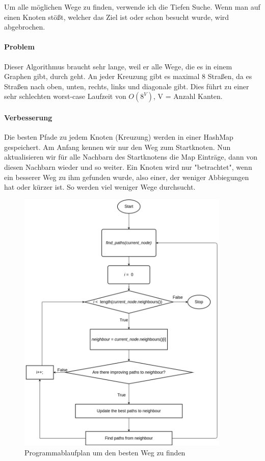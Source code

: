 \documentclass[a4paper,12pt,arial]{scrartcl}
\begin{document}
\par
Um alle möglichen Wege zu finden, verwende ich die Tiefen Suche. Wenn man auf einen Knoten stößt, welcher das Ziel ist oder schon besucht wurde, wird abgebrochen.
\paragraph{Problem} Dieser Algorithmus braucht sehr lange, weil er alle Wege, die es in einem Graphen gibt, durch geht. An jeder Kreuzung gibt es  maximal 8 Straßen, da es Straßen nach oben, unten, rechts, links und diagonale  gibt.
Dies führt zu einer sehr schlechten worst-case Laufzeit von $O(8^V)$, V = Anzahl Kanten.
\paragraph{Verbesserung}
Die besten Pfade zu jedem Knoten (Kreuzung) werden in einer HashMap gespeichert. Am Anfang kennen wir nur den Weg zum Startknoten. Nun aktualisieren wir für alle Nachbarn des Startknotens die Map Einträge, dann von diesen Nachbarn wieder und so weiter.
Ein Knoten wird nur "betrachtet", wenn ein besserer Weg zu ihm gefunden wurde, also einer, der weniger Abbiegungen hat oder kürzer ist. So werden viel weniger Wege durchsucht.
\newpage
\begin{figure}[h]
    \centering
    \includegraphics[width=0.9\textwidth]{pap_find_path_v4.png}
    \caption{Programmablaufplan um den besten Weg zu finden}
    \label{fig:pap3}
\end{figure}
\end{document}
